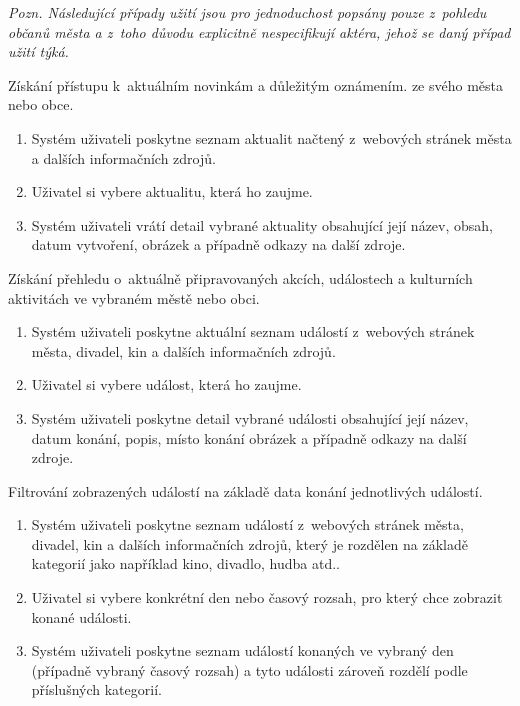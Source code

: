 \medskip
\textit{Pozn. Následující případy užití jsou pro jednoduchost popsány pouze z~pohledu občanů města a z~toho důvodu 
explicitně nespecifikují aktéra, jehož se daný případ užití týká.
}


Získání přístupu k~aktuálním novinkám a důležitým oznámením. 
ze svého města nebo obce. %

\begin{enumerate}
  \item Systém uživateli poskytne seznam aktualit načtený z~webových stránek města a dalších informačních zdrojů.
  \item Uživatel si vybere aktualitu, která ho zaujme.
  \item Systém uživateli vrátí detail vybrané aktuality obsahující její název, obsah, datum vytvoření, obrázek a případně odkazy na další zdroje.
\end{enumerate}

Získání přehledu o~aktuálně připravovaných akcích, událostech a kulturních 
aktivitách ve vybraném městě nebo obci. 

\begin{enumerate}
  \item Systém uživateli poskytne aktuální seznam událostí z~webových stránek města, divadel, kin a dalších informačních zdrojů.
  \item Uživatel si vybere událost, která ho zaujme.
  \item Systém uživateli poskytne detail vybrané události obsahující její název, datum konání, popis, místo konání obrázek a případně odkazy na další zdroje.
\end{enumerate}

Filtrování zobrazených událostí na základě data konání jednotlivých událostí.

\begin{enumerate}
  \item Systém uživateli poskytne seznam událostí z~webových stránek města, divadel, kin a dalších informačních zdrojů, který 
  je rozdělen na základě kategorií jako například kino, divadlo, hudba atd..
  \item Uživatel si vybere konkrétní den nebo časový rozsah, pro který chce zobrazit konané události.
  \item Systém uživateli poskytne seznam událostí konaných ve vybraný den (případně vybraný časový rozsah) a tyto události zároveň
  rozdělí podle příslušných kategorií.
\end{enumerate}

